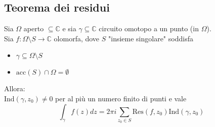 \documentclass[a4paper]{article}
\newcommand{\C}{\mathbb{C}}
\begin{document}
\subsection{Teorema dei residui}
\begin{tcolorbox}
	Sia $\Omega$ aperto $\subseteq\C$ e sia  $\gamma \subseteq\C$ circuito omotopo a un punto (in $\Omega$).
	\\Sia $f:\Omega\setminus S\to \C$ olomorfa, dove $S$ "insieme singolare" soddisfa
	\begin{itemize}
		\item $\gamma \subseteq\Omega \setminus S$
		\item $\text{acc} (S)\cap\Omega = \emptyset$
	\end{itemize}
	Allora:
	\\$\text{Ind}(\gamma,z_0)\neq 0$ per al più un numero finito di punti e vale
	\[\int_{\gamma}^{} f(z)dz=2\pi i \sum_{z_0\in S}^{} \text{Res}(f,z_0)\text{Ind}(\gamma,z_0)\] 
\end{tcolorbox}
\end{document}
